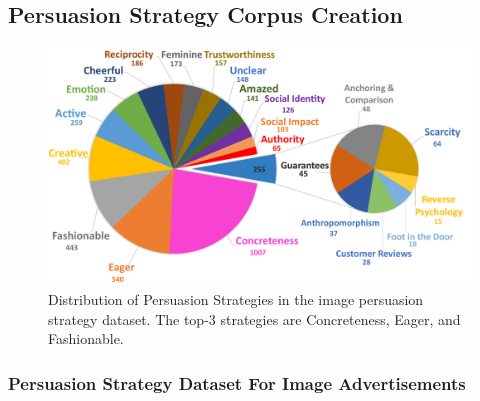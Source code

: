

\subsection{Persuasion Strategy Corpus Creation}
\label{sec:Persuasion Strategy Corpus Creation}

\begin{figure}[t]
        \centering
        \includegraphics[scale=0.3]{images/pie_chart.pdf}
        \caption{Distribution of Persuasion Strategies in the image persuasion strategy dataset. The top-3 strategies are Concreteness, Eager, and Fashionable. \small}
        \label{fig:persuasion-strategies-distribution}
    \end{figure}


\subsubsection{Persuasion Strategy Dataset For Image Advertisements}

